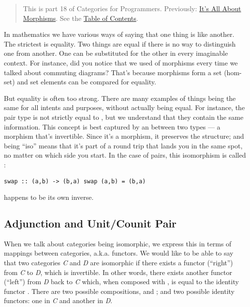 \begin{quote}
This is part 18 of Categories for Programmers. Previously:
\href{https://bartoszmilewski.com/2015/11/17/its-all-about-morphisms/}{It's
All About Morphisms}. See the
\href{https://bartoszmilewski.com/2014/10/28/category-theory-for-programmers-the-preface/}{Table
of Contents}.
\end{quote}

In mathematics we have various ways of saying that one thing is like
another. The strictest is equality. Two things are equal if there is no
way to distinguish one from another. One can be substituted for the
other in every imaginable context. For instance, did you notice that we
used  of morphisms every time we talked about commuting
diagrams? That's because morphisms form a set (hom-set) and set elements
can be compared for equality.

But equality is often too strong. There are many examples of things
being the same for all intents and purposes, without actually being
equal. For instance, the pair type  is not
strictly equal to , but we understand that they
contain the same information. This concept is best captured by an
 between two types --- a morphism that's invertible.
Since it's a morphism, it preserves the structure; and being ``iso''
means that it's part of a round trip that lands you in the same spot, no
matter on which side you start. In the case of pairs, this isomorphism
is called :

\begin{verbatim}
swap :: (a,b) -> (b,a) swap (a,b) = (b,a)
\end{verbatim}

 happens to be its own inverse.

\subsection{Adjunction and Unit/Counit
Pair}\label{adjunction-and-unitcounit-pair}

When we talk about categories being isomorphic, we express this in terms
of mappings between categories, a.k.a. functors. We would like to be
able to say that two categories \emph{C} and \emph{D} are isomorphic if
there exists a functor  (``right'') from \emph{C} to \emph{D},
which is invertible. In other words, there exists another functor
 (``left'') from \emph{D} back to \emph{C} which, when
composed with , is equal to the identity functor .
There are two possible compositions,  and
; and two possible identity functors: one in \emph{C}
and another in \emph{D}.

